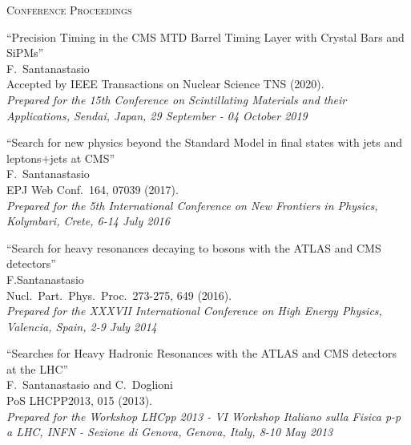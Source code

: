 \documentclass[10pt, a4paper]{article}
\begin{document}
\begin{thebibliography}{599}

\vspace{0.1cm} \begin{center} \textsc{Conference Proceedings} \end{center} \vspace{0.05cm}

  ``Precision Timing in the CMS MTD Barrel Timing Layer with Crystal Bars and SiPMs''\\
  F.~Santanastasio\\
  Accepted by IEEE Transactions on Nuclear Science TNS (2020).\\
  {\it Prepared for the 15th Conference on Scintillating Materials and their Applications, Sendai, Japan, 29 September - 04 October 2019} 

  ``Search for new physics beyond the Standard Model in final states with jets and leptons+jets at CMS''\\
 F.~Santanastasio\\
  EPJ Web Conf.\ 164, 07039 (2017).\\
  {\it Prepared for the 5th International Conference on New Frontiers in Physics, Kolymbari, Crete, 6-14 July 2016} 

  ``Search for heavy resonances decaying to bosons with the ATLAS and
  CMS detectors''\\
 F.Santanastasio\\
  Nucl.\ Part.\ Phys.\ Proc.\  273-275, 649 (2016).\\
  {\it Prepared for the XXXVII International Conference on High Energy Physics, Valencia, Spain, 2-9 July 2014}

  ``Searches for Heavy Hadronic Resonances with the ATLAS and CMS
  detectors at the LHC''\\
F.~Santanastasio and C.~Doglioni\\
  PoS LHCPP2013, 015 (2013).\\
  {\it Prepared for the Workshop LHCpp 2013 - VI Workshop Italiano sulla Fisica p-p a LHC, INFN - Sezione di Genova, Genova, Italy, 8-10 May 2013}


\end{thebibliography}
\end{document}
